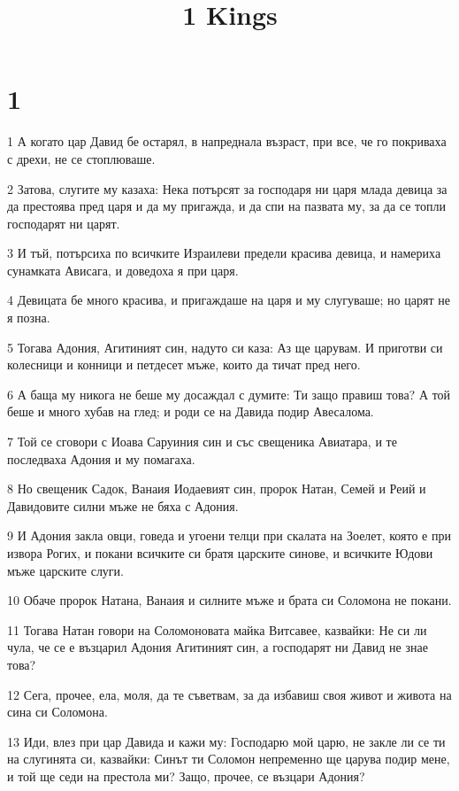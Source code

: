 

\title{1 Kings}


\chapter{1}

\par 1 А когато цар Давид бе остарял, в напреднала възраст, при все, че го покриваха с дрехи, не се стоплюваше.
\par 2 Затова, слугите му казаха: Нека потърсят за господаря ни царя млада девица за да престоява пред царя и да му пригажда, и да спи на пазвата му, за да се топли господарят ни царят.
\par 3 И тъй, потърсиха по всичките Израилеви предели красива девица, и намериха сунамката Ависага, и доведоха я при царя.
\par 4 Девицата бе много красива, и пригаждаше на царя и му слугуваше; но царят не я позна.
\par 5 Тогава Адония, Агитиният син, надуто си каза: Аз ще царувам. И приготви си колесници и конници и петдесет мъже, които да тичат пред него.
\par 6 А баща му никога не беше му досаждал с думите: Ти защо правиш това? А той беше и много хубав на глед; и роди се на Давида подир Авесалома.
\par 7 Той се сговори с Иоава Саруиния син и със свещеника Авиатара, и те последваха Адония и му помагаха.
\par 8 Но свещеник Садок, Ванаия Иодаевият син, пророк Натан, Семей и Реий и Давидовите силни мъже не бяха с Адония.
\par 9 И Адония закла овци, говеда и угоени телци при скалата на Зоелет, която е при извора Рогих, и покани всичките си братя царските синове, и всичките Юдови мъже царските слуги.
\par 10 Обаче пророк Натана, Ванаия и силните мъже и брата си Соломона не покани.
\par 11 Тогава Натан говори на Соломоновата майка Витсавее, казвайки: Не си ли чула, че се е възцарил Адония Агитиният син, а господарят ни Давид не знае това?
\par 12 Сега, прочее, ела, моля, да те съветвам, за да избавиш своя живот и живота на сина си Соломона.
\par 13 Иди, влез при цар Давида и кажи му: Господарю мой царю, не закле ли се ти на слугинята си, казвайки: Синът ти Соломон непременно ще царува подир мене, и той ще седи на престола ми? Защо, прочее, се възцари Адония?
